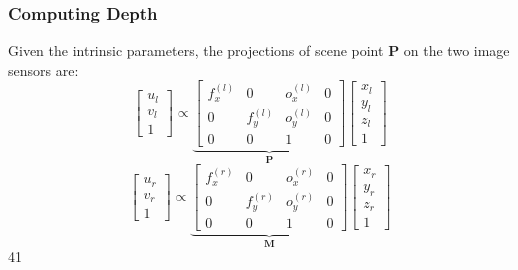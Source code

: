 \begin{frame}
    \frametitle{Computing Depth}
    Given the intrinsic parameters, the projections of scene point $\mathbf{P}$ on the two image sensors are:
    $$
    \begin{bmatrix} u_l \\ v_l \\ 1 \end{bmatrix} \propto
    \underbrace{\begin{bmatrix}
        f_x^{(l)} & 0 & o_x^{(l)} & 0 \\
        0 & f_y^{(l)} & o_y^{(l)} & 0 \\
        0 & 0 & 1 & 0
    \end{bmatrix}}_{\mathbf{P}}
    \begin{bmatrix} x_l \\ y_l \\ z_l \\ 1 \end{bmatrix}
    $$
    $$
    \begin{bmatrix} u_r \\ v_r \\ 1 \end{bmatrix} \propto
    \underbrace{\begin{bmatrix}
        f_x^{(r)} & 0 & o_x^{(r)} & 0 \\
        0 & f_y^{(r)} & o_y^{(r)} & 0 \\
        0 & 0 & 1 & 0
    \end{bmatrix}}_{\mathbf{M}}
    \begin{bmatrix} x_r \\ y_r \\ z_r \\ 1 \end{bmatrix}
    $$
    \hfill 41
\end{frame}


